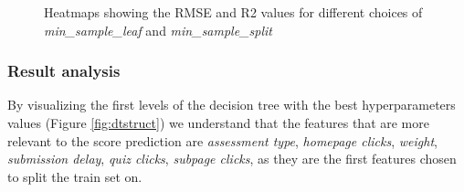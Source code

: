 \documentclass{article}
\begin{document}
\begin{figure}[h!]%
    \centering
    \qquad
    \caption{Heatmaps showing the RMSE and R2 values for different choices of \textit{min\_sample\_leaf} and \textit{min\_sample\_split}}%
    \label{fig:heatmap}%
\end{figure}

\subsubsection{Result analysis}
By visualizing the first levels of the decision tree with the best hyperparameters values (Figure \ref{fig:dtstruct}) we understand that the features that are more relevant to the score prediction are \textit{assessment type}, \textit{homepage clicks}, \textit{weight}, \textit{submission delay}, \textit{quiz clicks}, \textit{subpage clicks}, as they are the first features chosen to split the train set on. \\
\end{document}
